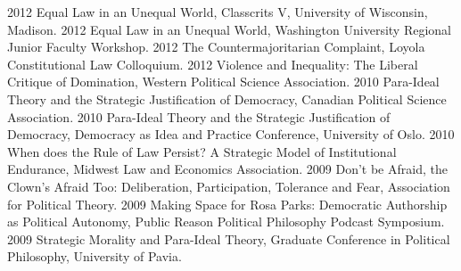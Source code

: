 \documentclass[letterpaper]{moderncv}
\begin{document}
\cvitem
{2012}
{Equal Law in an Unequal World, Classcrits V, University of Wisconsin, Madison.}
\vspace{1mm}
\cvitem
{2012}
{Equal Law in an Unequal World, Washington University Regional Junior Faculty Workshop.}
\vspace{1mm}
\cvitem
{2012}
{The Countermajoritarian Complaint, Loyola Constitutional Law Colloquium.}
\vspace{1mm}
\cvitem
{2012}
{Violence and Inequality: The Liberal Critique of Domination, Western Political Science Association.}
\vspace{1mm}
\cvitem
{2010}
{Para-Ideal Theory and the Strategic Justification of Democracy, Canadian Political Science Association.}
\vspace{1mm}
\cvitem
{2010}
{Para-Ideal Theory and the Strategic Justification of Democracy, Democracy as Idea and Practice Conference, University of Oslo.}
\vspace{1mm}
\cvitem
{2010}
{When does the Rule of Law Persist? A Strategic Model of Institutional Endurance, Midwest Law and Economics Association.}
\vspace{1mm}
\cvitem
{2009}
{Don't be Afraid, the Clown's Afraid Too: Deliberation, Participation, Tolerance and Fear, Association for Political Theory.}
\vspace{1mm}
\cvitem
{2009}
{Making Space for Rosa Parks: Democratic Authorship as Political Autonomy, Public Reason Political Philosophy Podcast Symposium.}
\vspace{1mm}
\cvitem
{2009}
{Strategic Morality and Para-Ideal Theory, Graduate Conference in Political Philosophy, University of Pavia.}
\vspace{1mm}
\end{document}

